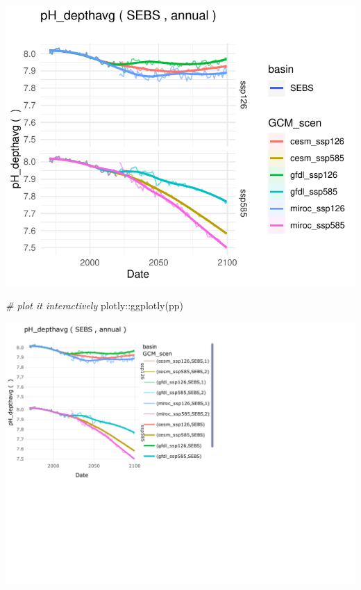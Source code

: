 \documentclass[
]{article}
\newenvironment{Shaded}{\begin{snugshade}}{\end{snugshade}}
\newcommand{\CommentTok}[1]{\textcolor[rgb]{0.56,0.35,0.01}{\textit{#1}}}
\newcommand{\FunctionTok}[1]{\textcolor[rgb]{0.00,0.00,0.00}{#1}}
\newcommand{\NormalTok}[1]{#1}
\newcommand{\SpecialCharTok}[1]{\textcolor[rgb]{0.00,0.00,0.00}{#1}}
\begin{document}
\begin{center}\includegraphics{ACLIM2_quickStart_files/figure-latex/ts-2} \end{center}

\begin{Shaded}
\begin{Highlighting}[]
  \CommentTok{\# plot it interactively}
\NormalTok{  plotly}\SpecialCharTok{::}\FunctionTok{ggplotly}\NormalTok{(pp)}
\end{Highlighting}
\end{Shaded}

\begin{center}\includegraphics{ACLIM2_quickStart_files/figure-latex/unnamed-chunk-5-1} \end{center}
\end{document}
